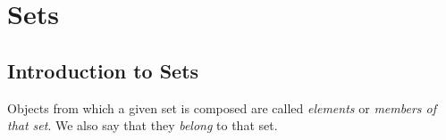 \documentclass[a4paper,10pt,twoside]{book}
\begin{document}

\restoregeometry
\thispagestyle{empty}
\setcounter{page}{0}
\tableofcontents
\thispagestyle{empty}
\setcounter{page}{0}


\chapter{Sets}
\section{Introduction to Sets}

Objects from which a given set is composed are called \textit{elements} or \textit{members of that set}. We also say that they \textit{belong} to that set.

\end{document}
